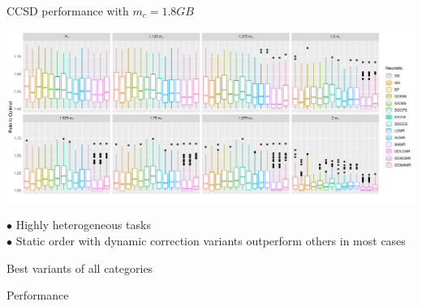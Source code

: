 \documentclass[mathserif,hyperref={pdfpagemode=FullScreen}]{beamer}
\begin{document}
\begin{frame}{CCSD performance with $m_c=1.8GB$}
\begin{center}
	\includegraphics[width=1.05\linewidth]{./diagrams/results/ratio_to_optimal_selected_ccsd.pdf}
\end{center}
$\bullet$ Highly heterogeneous tasks\\
$\bullet$ Static order with dynamic correction variants outperform others in most cases
\end{frame}

\begin{frame}{Best variants of all categories}
\begin{block}{  Performance}
	\begin{center}
	\end{center}
\end{block}
\end{frame}
\end{document}
